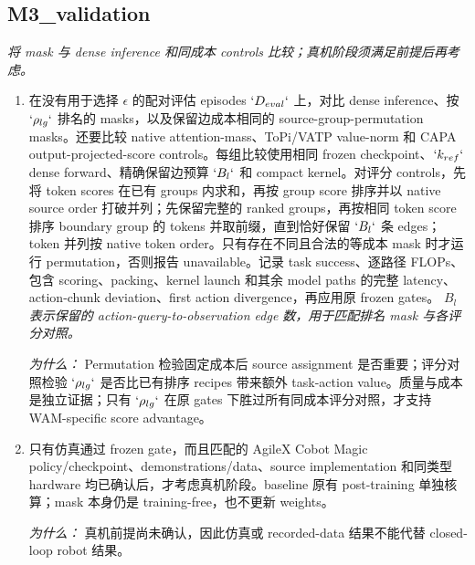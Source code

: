 \documentclass[10pt,a4paper]{article}
\begin{document}
\subsection*{M3\_validation}
\emph{将 mask 与 dense inference 和同成本 controls 比较；真机阶段须满足前提后再考虑。}
\begin{enumerate}[leftmargin=*,start=6]
  \item 在没有用于选择 \(\epsilon \) 的配对评估 episodes \(`D_{eval}`\) 上，对比 dense inference、按 \(`\rho _{lg}`\) 排名的 masks，以及保留边成本相同的 source-group-permutation masks。还要比较 native attention-mass、ToPi/VATP value-norm 和 CAPA output-projected-score controls。每组比较使用相同 frozen checkpoint、\(`k_{ref}`\) dense forward、精确保留边预算 \(`B_{l}`\) 和 compact kernel。对评分 controls，先将 token scores 在已有 groups 内求和，再按 group score 排序并以 native source order 打破并列；先保留完整的 ranked groups，再按相同 token score 排序 boundary group 的 tokens 并取前缀，直到恰好保留 \(`B_{l}`\) 条 edges；token 并列按 native token order。只有存在不同且合法的等成本 mask 时才运行 permutation，否则报告 unavailable。记录 task success、逐路径 FLOPs、包含 scoring、packing、kernel launch 和其余 model paths 的完整 latency、action-chunk deviation、first action divergence，再应用原 frozen gates。
\noindent\emph{\(B_{l}\) 表示保留的 action-query-to-observation edge 数，用于匹配排名 mask 与各评分对照。}
\par{}
\par\emph{为什么：} Permutation 检验固定成本后 source assignment 是否重要；评分对照检验 \(`\rho _{lg}`\) 是否比已有排序 recipes 带来额外 task-action value。质量与成本是独立证据；只有 \(`\rho _{lg}`\) 在原 gates 下胜过所有同成本评分对照，才支持 WAM-specific score advantage。
  \item 只有仿真通过 frozen gate，而且匹配的 AgileX Cobot Magic policy/checkpoint、demonstrations/data、source implementation 和同类型 hardware 均已确认后，才考虑真机阶段。baseline 原有 post-training 单独核算；mask 本身仍是 training-free，也不更新 weights。
\par\emph{为什么：} 真机前提尚未确认，因此仿真或 recorded-data 结果不能代替 closed-loop robot 结果。
\end{enumerate}
\end{document}
